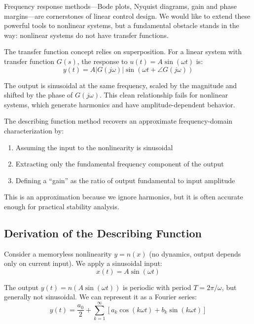 Frequency response methods---Bode plots, Nyquist diagrams, gain and phase margins---are cornerstones of linear control design. We would like to extend these powerful tools to nonlinear systems, but a fundamental obstacle stands in the way: nonlinear systems do not have transfer functions.

The transfer function concept relies on superposition. For a linear system with transfer function $G(s)$, the response to $u(t) = A\sin(\omega t)$ is:
\begin{equation}
y(t) = A|G(j\omega)|\sin(\omega t + \angle G(j\omega))
\end{equation}

The output is sinusoidal at the same frequency, scaled by the magnitude and shifted by the phase of $G(j\omega)$. This clean relationship fails for nonlinear systems, which generate harmonics and have amplitude-dependent behavior.

The describing function method recovers an approximate frequency-domain characterization by:
\begin{enumerate}
    \item Assuming the input to the nonlinearity is sinusoidal
    \item Extracting only the fundamental frequency component of the output
    \item Defining a ``gain'' as the ratio of output fundamental to input amplitude
\end{enumerate}

This is an approximation because we ignore harmonics, but it is often accurate enough for practical stability analysis.

\subsection{Derivation of the Describing Function}

Consider a memoryless nonlinearity $y = n(x)$ (no dynamics, output depends only on current input). We apply a sinusoidal input:
\begin{equation}
x(t) = A\sin(\omega t)
\end{equation}

The output $y(t) = n(A\sin(\omega t))$ is periodic with period $T = 2\pi/\omega$, but generally not sinusoidal. We can represent it as a Fourier series:
\begin{equation}
y(t) = \frac{a_0}{2} + \sum_{k=1}^{\infty} \left[ a_k \cos(k\omega t) + b_k \sin(k\omega t) \right]
\label{eq:fourier_output}
\end{equation}

